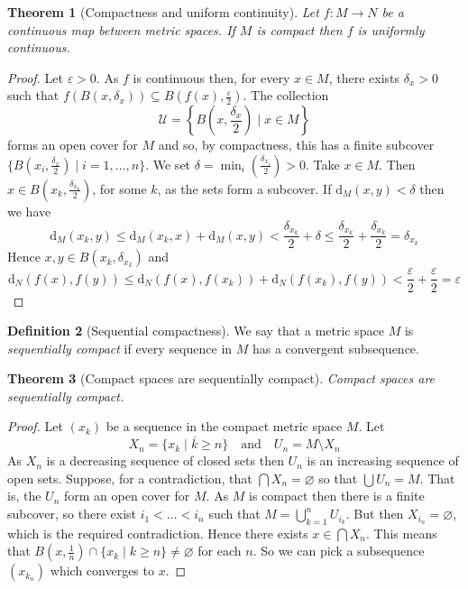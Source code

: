 \documentclass[10pt,fleqn]{article}
\newcommand{\met}{\mathrm{d}}
\newcommand{\eps}{\varepsilon}
\theoremstyle{definition} \newtheorem{defn}{Definition}[section]
\theoremstyle{plain}      \newtheorem{thm}[defn]{Theorem}
\theoremstyle{definition} \newtheorem{prop}[defn]{Proposition}
\theoremstyle{definition} \newtheorem{cor}[defn]{Corollary}
\theoremstyle{definition} \newtheorem{ex}[defn]{Example}
\theoremstyle{definition} \newtheorem{rem}[defn]{Remark}
\begin{document}
\begin{thm}[Compactness and uniform continuity]
    Let $f:M\to N$ be a continuous map between metric spaces.
    If $M$ is compact then $f$ is uniformly continuous.
\end{thm}

\begin{proof}
    Let $\eps>0$.
    As $f$ is continuous then, for every $x\in M$, there exists $\delta_x>0$ such that $f(B(x,\delta_x))\subseteq B(f(x),\frac{\eps}{2})$.
    The collection
    \[
        \mathcal{U}=
        \left\{B(x,\frac{\delta_x}{2})\mid x\in M\right\}
    \]
    forms an open cover for $M$ and so, by compactness, this has a finite subcover $\{B\left(x_i,\frac{\delta_x}{2}\right)\mid i=1,\ldots,n\}$.
    We set $\delta=\min_i\left(\frac{\delta_{x_i}}{2}\right)>0$.
    Take $x\in M$.
    Then $x\in B\left(x_k,\frac{\delta_{x_k}}{2}\right)$, for some $k$, as the sets form a subcover.
    If $\met_M(x,y)<\delta$ then we have
    \[
        \met_M(x_k,y)\leq
        \met_M(x_k,x)+\met_M(x,y)<
        \frac{\delta_{x_k}}{2}+\delta\leq
        \frac{\delta_{x_k}}{2}+\frac{\delta_{x_k}}{2}=
        \delta_{x_k}
    \]
    Hence $x,y\in B(x_k,\delta_{x_k})$ and
    \[
        \met_N(f(x),f(y))\leq
        \met_N(f(x),f(x_k))+\met_N(f(x_k),f(y))<
        \frac{\eps}{2}+\frac{\eps}{2}=
        \eps
    \]
\end{proof}

\begin{defn}[Sequential compactness]
    We say that a metric space $M$ is \emph{sequentially compact} if every sequence in $M$ has a convergent subsequence.
\end{defn}

\begin{thm}[Compact spaces are sequentially compact]\label{compact-spaces-convergent}
    Compact spaces are sequentially compact.
\end{thm}

\begin{proof}
    Let $(x_k)$ be a sequence in the compact metric space $M$.
    Let
    \[
        X_n=\overline{\{x_k\mid k\geq n\}}\quad
        \text{and}\quad
        U_n=M\setminus X_n
    \]
    As $X_n$ is a decreasing sequence of closed sets then $U_n$ is an increasing sequence of open sets.
    Suppose, for a contradiction, that $\bigcap X_n=\varnothing$ so that $\bigcup U_n=M$.
    That is, the $U_n$ form an open cover for $M$.
    As $M$ is compact then there is a finite subcover, so there exist $i_1<\ldots<i_n$ such that $M=\bigcup_{k=1}^nU_{i_k}$.
    But then $X_{i_n}=\varnothing$, which is the required contradiction.
    Hence there exists $x\in\bigcap X_n$.
    This means that $B(x,\frac{1}{n})\cap\{x_k\mid k\geq n\}\neq\varnothing$ for each $n$.
    So we can pick a subsequence $(x_{k_n})$ which converges to $x$.
\end{proof}
\end{document}
